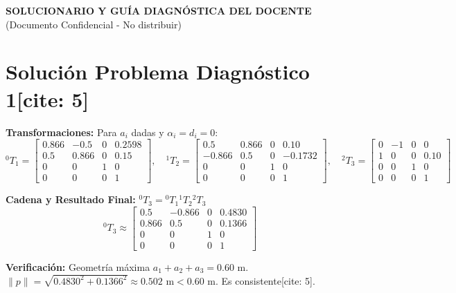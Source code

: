 \documentclass[11pt, a4paper]{article}
\begin{document}
\begin{center}
    \Large\textbf{\textcolor{red!80!black}{SOLUCIONARIO Y GUÍA DIAGNÓSTICA DEL DOCENTE}}\\
    \vspace{0.2cm}
    \normalsize (Documento Confidencial - No distribuir)
\end{center}

\vspace{0.4cm}

\section*{Solución Problema Diagnóstico 1[cite: 5]}
\textbf{Transformaciones:} Para $a_i$ dadas y $\alpha_i = d_i = 0$:
\begin{equation*}
    {}^0T_1 = \begin{bmatrix} 0.866 & -0.5 & 0 & 0.2598 \\ 0.5 & 0.866 & 0 & 0.15 \\ 0 & 0 & 1 & 0 \\ 0 & 0 & 0 & 1 \end{bmatrix}, \quad
    {}^1T_2 = \begin{bmatrix} 0.5 & 0.866 & 0 & 0.10 \\ -0.866 & 0.5 & 0 & -0.1732 \\ 0 & 0 & 1 & 0 \\ 0 & 0 & 0 & 1 \end{bmatrix}, \quad
    {}^2T_3 = \begin{bmatrix} 0 & -1 & 0 & 0 \\ 1 & 0 & 0 & 0.10 \\ 0 & 0 & 1 & 0 \\ 0 & 0 & 0 & 1 \end{bmatrix}
\end{equation*}

\textbf{Cadena y Resultado Final:} ${}^0T_3 = {}^0T_1 {}^1T_2 {}^2T_3$
\begin{equation*}
    {}^0T_3 \approx \begin{bmatrix} 0.5 & -0.866 & 0 & 0.4830 \\ 0.866 & 0.5 & 0 & 0.1366 \\ 0 & 0 & 1 & 0 \\ 0 & 0 & 0 & 1 \end{bmatrix}
\end{equation*}

\textbf{Verificación:} Geometría máxima $a_1+a_2+a_3 = 0.60\text{ m}$. $\|p\| = \sqrt{0.4830^2+0.1366^2} \approx 0.502\text{ m} < 0.60\text{ m}$. Es consistente[cite: 5].
\end{document}

